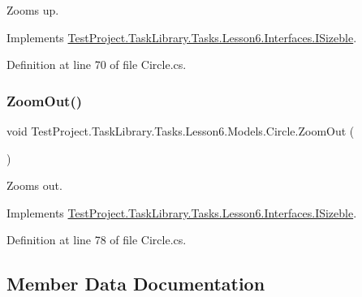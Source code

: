 Zooms up. 



Implements \mbox{\hyperlink{interface_test_project_1_1_task_library_1_1_tasks_1_1_lesson6_1_1_interfaces_1_1_i_sizeble_ada6181d54740d570d1575307c2574a0d}{Test\+Project.\+Task\+Library.\+Tasks.\+Lesson6.\+Interfaces.\+I\+Sizeble}}.



Definition at line 70 of file Circle.\+cs.

\mbox{\label{class_test_project_1_1_task_library_1_1_tasks_1_1_lesson6_1_1_models_1_1_circle_abde3e575c891819e0bd8c97a3d0472e7}} 
\subsubsection{\texorpdfstring{ZoomOut()}{ZoomOut()}}
{\footnotesize\ttfamily void Test\+Project.\+Task\+Library.\+Tasks.\+Lesson6.\+Models.\+Circle.\+Zoom\+Out (\begin{DoxyParamCaption}{ }\end{DoxyParamCaption})}



Zooms out. 



Implements \mbox{\hyperlink{interface_test_project_1_1_task_library_1_1_tasks_1_1_lesson6_1_1_interfaces_1_1_i_sizeble_ab4a49e0b6bbc4aa62f9ac1175b73e704}{Test\+Project.\+Task\+Library.\+Tasks.\+Lesson6.\+Interfaces.\+I\+Sizeble}}.



Definition at line 78 of file Circle.\+cs.



\subsection{Member Data Documentation}
\mbox{\label{class_test_project_1_1_task_library_1_1_tasks_1_1_lesson6_1_1_models_1_1_circle_a459f59c96a830851a5a17e1efb26197d}} 
